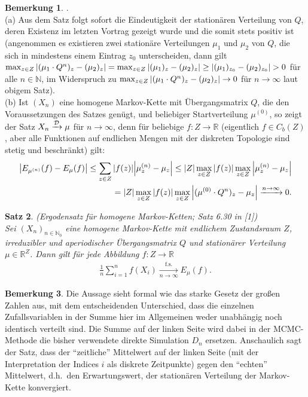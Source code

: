 \documentclass[twoside]{article}
\newcounter{lecnum}
\newtheorem{theorem}{Satz}[lecnum]
\theoremstyle{definition}
\newtheorem{remark}[theorem]{Bemerkung}
\begin{document}
\begin{remark}.\\
(a) Aus dem Satz folgt sofort die Eindeutigkeit der stationären Verteilung von $Q$, deren Existenz im letzten Vortrag gezeigt wurde und die somit stets positiv ist (angenommen es existieren zwei stationäre Verteilungen $\mu_1$ und $\mu_2$ von $Q$, die sich in mindestens einem Eintrag $z_0$ unterscheiden, dann gilt $\max_{z \in Z} \abs{(\mu_1 \cdot Q^n)_z - (\mu_2)_z} = \max_{z \in Z} \abs{(\mu_1)_z - (\mu_2)_z} \geq \abs{(\mu_1)_{z_0} - (\mu_2)_{z_0}} >0$ für alle $n \in \mathbb{N}$, im Widerspruch zu $\max_{z \in Z} \abs{(\mu_1 \cdot Q^n)_z - (\mu_2)_z} \to 0$ für $n \to \infty$ laut obigem Satz).\\
(b) Ist $(X_n)$ eine homogene Markov-Kette mit Übergangsmatrix $Q$, die den Voraussetzungen des Satzes genügt, und beliebiger Startverteilung $\mu^{(0)}$, so zeigt der Satz $X_n \xrightarrow{{\cal D}} \mu$ für $n \to \infty$, denn für beliebige $f:Z \to \mathbb{R}$ (eigentlich $f \in C_b(Z)$, aber alle Funktionen auf endlichen Mengen mit der diskreten Topologie sind stetig und beschränkt) gilt: 
\begin{align}
\abs{E_{\mu^{(n)}}(f) - E_{\mu}(f)} \leq \sum_{z \in Z} \abs{f(z)} \abs{\mu^{(n)}_z - \mu_z} \leq \abs{Z} \max_{z \in Z} \abs{f(z)} \max_{z \in Z} \abs{\mu^{(n)}_z- \mu_z} \\
= \abs{Z} \max_{z \in Z} \abs{f(z)} \max_{z \in Z} \abs{(\mu^{(0)} \cdot Q^n)_z- \mu_z} \xrightarrow{n \to \infty} 0. 
\end{align}
\end{remark}
\begin{theorem}(Ergodensatz für homogene Markov-Ketten; Satz 6.30 in [1])\\
Sei $(X_n)_{n \in \mathbb{N}_0}$ eine homogene Markov-Kette mit endlichem Zustandsraum $Z$,  irreduzibler und aperiodischer Übergangsmatrix $Q$ und stationärer Verteilung $\mu \in \mathbb{R}^Z$. Dann gilt für jede Abbildung $f:Z\to \mathbb{R}$
\begin{align}
\frac{1}{n} \sum_{i=1}^n f(X_i) \xrightarrow[n  \to \infty]{\text{f.s.}} E_\mu(f).
\end{align}
\end{theorem}
\begin{remark}
Die Aussage sieht formal wie das starke Gesetz der großen Zahlen aus, mit dem entscheidenden Unterschied, dass die einzelnen Zufallsvariablen in der Summe hier im Allgemeinen weder unabhängig noch identisch verteilt sind. Die Summe auf der linken Seite wird dabei in der MCMC-Methode die bisher verwendete direkte Simulation $D_n$ ersetzen. Anschaulich sagt der Satz, dass der \enquote{zeitliche} Mittelwert auf der linken Seite (mit der Interpretation der Indices $i$ als diskrete Zeitpunkte) gegen den \enquote{echten} Mittelwert, d.h.\ den Erwartungswert, der stationären Verteilung der Markov-Kette konvergiert.
\end{remark}
\end{document}
